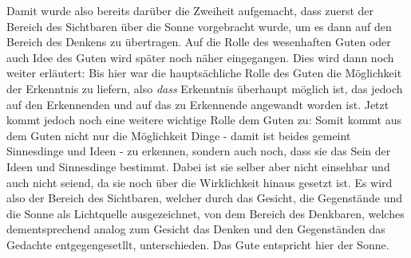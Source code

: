 Damit wurde also bereits darüber die Zweiheit aufgemacht, dass zuerst der Bereich des Sichtbaren über die Sonne vorgebracht wurde, um es dann auf den Bereich des Denkens zu übertragen.  
Auf die Rolle des wesenhaften Guten oder auch Idee des Guten wird später noch näher eingegangen. 
Dies wird dann noch weiter erläutert:
Bis hier war die hauptsächliche Rolle des Guten die Möglichkeit der Erkenntnis zu liefern, also \emph{dass} Erkenntnis überhaupt möglich ist, das jedoch auf den Erkennenden und auf das zu Erkennende angewandt worden ist. Jetzt kommt jedoch noch eine weitere wichtige Rolle dem Guten zu:
Somit kommt aus dem Guten nicht nur die Möglichkeit Dinge - damit ist beides gemeint Sinnesdinge und Ideen - zu erkennen, sondern auch noch, dass sie das Sein der Ideen und Sinnesdinge bestimmt. Dabei ist sie selber aber nicht einsehbar und auch nicht seiend, da sie noch über die Wirklichkeit hinaus gesetzt ist. 
Es wird also der Bereich des Sichtbaren, welcher durch das Gesicht, die Gegenstände und die Sonne als Lichtquelle ausgezeichnet, von dem Bereich des Denkbaren, welches dementsprechend analog zum Gesicht das Denken und den Gegenständen das Gedachte entgegengesetllt, unterschieden. Das Gute entspricht hier der Sonne.\\
